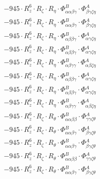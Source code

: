 \documentclass{article}
\begin{document}
\begin{subequations}
\begin{gather}
\begin{array}{c}
 \\[0.2em] 		 - 945 \cdot R_{z}^{6} \cdot R_{\zeta{}} \cdot R_{\eta{}} \cdot \Phi{}^{B}_{\alpha{}\alpha{}\beta{}\gamma{}} \cdot \Phi{}^{A}_{\beta{}\gamma{}\zeta{}\eta{}} 
 \\[0.2em] 		 - 945 \cdot R_{z}^{6} \cdot R_{\zeta{}} \cdot R_{\eta{}} \cdot \Phi{}^{B}_{\alpha{}\alpha{}\beta{}\gamma{}} \cdot \Phi{}^{A}_{\beta{}\gamma{}\zeta{}\eta{}} 
 \\[0.2em] 		 - 945 \cdot R_{z}^{6} \cdot R_{\zeta{}} \cdot R_{\eta{}} \cdot \Phi{}^{B}_{\alpha{}\beta{}\beta{}\gamma{}} \cdot \Phi{}^{A}_{\alpha{}\gamma{}\zeta{}\eta{}} 
 \\[0.2em] 		 - 945 \cdot R_{z}^{6} \cdot R_{\zeta{}} \cdot R_{\eta{}} \cdot \Phi{}^{B}_{\alpha{}\beta{}\beta{}\gamma{}} \cdot \Phi{}^{A}_{\alpha{}\gamma{}\zeta{}\eta{}} 
 \\[0.2em] 		 - 945 \cdot R_{z}^{6} \cdot R_{\zeta{}} \cdot R_{\eta{}} \cdot \Phi{}^{B}_{\alpha{}\beta{}\gamma{}\gamma{}} \cdot \Phi{}^{A}_{\alpha{}\beta{}\zeta{}\eta{}} 
 \\[0.2em] 		 - 945 \cdot R_{z}^{6} \cdot R_{\zeta{}} \cdot R_{\eta{}} \cdot \Phi{}^{B}_{\alpha{}\beta{}\beta{}\gamma{}} \cdot \Phi{}^{A}_{\alpha{}\gamma{}\zeta{}\eta{}} 
 \\[0.2em] 		 - 945 \cdot R_{z}^{6} \cdot R_{\zeta{}} \cdot R_{\eta{}} \cdot \Phi{}^{B}_{\alpha{}\beta{}\beta{}\gamma{}} \cdot \Phi{}^{A}_{\alpha{}\gamma{}\zeta{}\eta{}} 
 \\[0.2em] 		 - 945 \cdot R_{z}^{6} \cdot R_{\zeta{}} \cdot R_{\eta{}} \cdot \Phi{}^{B}_{\alpha{}\beta{}\gamma{}\gamma{}} \cdot \Phi{}^{A}_{\alpha{}\beta{}\zeta{}\eta{}} 
 \\[0.2em] 		 - 945 \cdot R_{z}^{6} \cdot R_{\zeta{}} \cdot R_{\theta{}} \cdot \Phi{}^{B}_{\alpha{}\alpha{}\beta{}\beta{}} \cdot \Phi{}^{A}_{\gamma{}\gamma{}\zeta{}\theta{}} 
 \\[0.2em] 		 - 945 \cdot R_{z}^{6} \cdot R_{\zeta{}} \cdot R_{\theta{}} \cdot \Phi{}^{B}_{\alpha{}\alpha{}\beta{}\gamma{}} \cdot \Phi{}^{A}_{\beta{}\gamma{}\zeta{}\theta{}} 
 \\[0.2em] 		 - 945 \cdot R_{z}^{6} \cdot R_{\zeta{}} \cdot R_{\theta{}} \cdot \Phi{}^{B}_{\alpha{}\alpha{}\beta{}\gamma{}} \cdot \Phi{}^{A}_{\beta{}\gamma{}\zeta{}\theta{}} 
 \\[0.2em] 		 - 945 \cdot R_{z}^{6} \cdot R_{\zeta{}} \cdot R_{\theta{}} \cdot \Phi{}^{B}_{\alpha{}\alpha{}\beta{}\beta{}} \cdot \Phi{}^{A}_{\gamma{}\gamma{}\zeta{}\theta{}} 
 \\[0.2em] 		 - 945 \cdot R_{z}^{6} \cdot R_{\zeta{}} \cdot R_{\theta{}} \cdot \Phi{}^{B}_{\alpha{}\alpha{}\beta{}\gamma{}} \cdot \Phi{}^{A}_{\beta{}\gamma{}\zeta{}\theta{}} 

\end{array}
\end{gather}
\end{subequations}
\end{document}
